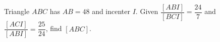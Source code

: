 Triangle $ABC$ has $AB=48$ and incenter $I$. Given $\dfrac{[ABI]}{[BCI]}=\dfrac{24}{7}$ and $\dfrac{[ACI]}{[ABI]}=\dfrac{25}{24}$, find $[ABC]$.
